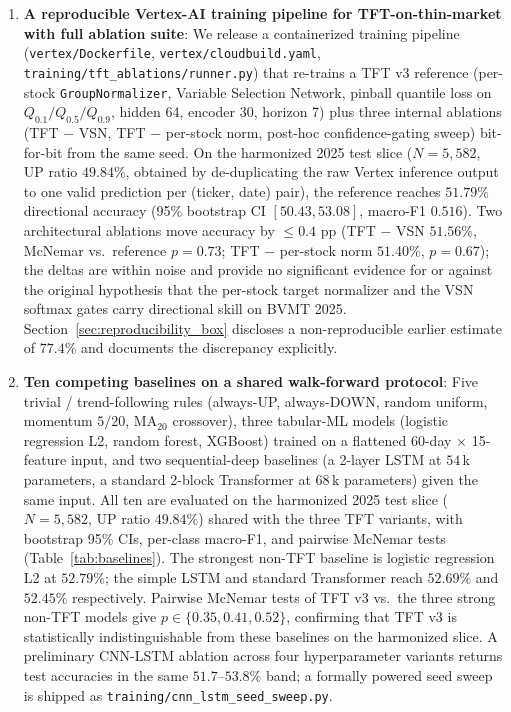 \documentclass[conference]{IEEEtran}
\begin{document}
\begin{enumerate}
\item \textbf{A reproducible Vertex-AI training pipeline for TFT-on-thin-market with full ablation suite}: We release a containerized training pipeline (\texttt{vertex/Dockerfile}, \texttt{vertex/cloudbuild.yaml}, \texttt{training/tft\_ablations/runner.py}) that re-trains a TFT v3 reference (per-stock \texttt{GroupNormalizer}, Variable Selection Network, pinball quantile loss on $Q_{0.1}/Q_{0.5}/Q_{0.9}$, hidden 64, encoder 30, horizon 7) plus three internal ablations (TFT $-$ VSN, TFT $-$ per-stock norm, post-hoc confidence-gating sweep) bit-for-bit from the same seed. On the harmonized 2025 test slice ($N=5{,}582$, UP ratio $49.84\%$, obtained by de-duplicating the raw Vertex inference output to one valid prediction per (ticker, date) pair), the reference reaches $51.79\%$ directional accuracy (95\% bootstrap CI $[50.43, 53.08]$, macro-F1 $0.516$). Two architectural ablations move accuracy by $\leq 0.4$ pp (TFT $-$ VSN $51.56\%$, McNemar vs.\ reference $p = 0.73$; TFT $-$ per-stock norm $51.40\%$, $p = 0.67$); the deltas are within noise and provide no significant evidence for or against the original hypothesis that the per-stock target normalizer and the VSN softmax gates carry directional skill on BVMT 2025. Section~\ref{sec:reproducibility_box} discloses a non-reproducible earlier estimate of $77.4\%$ and documents the discrepancy explicitly.

\item \textbf{Ten competing baselines on a shared walk-forward protocol}: Five trivial / trend-following rules (always-UP, always-DOWN, random uniform, momentum $5/20$, MA$_{20}$ crossover), three tabular-ML models (logistic regression L2, random forest, XGBoost) trained on a flattened 60-day $\times$ 15-feature input, and two sequential-deep baselines (a 2-layer LSTM at $54$\,k parameters, a standard 2-block Transformer at $68$\,k parameters) given the same input. All ten are evaluated on the harmonized 2025 test slice ($N=5{,}582$, UP ratio $49.84\%$) shared with the three TFT variants, with bootstrap 95\% CIs, per-class macro-F1, and pairwise McNemar tests (Table~\ref{tab:baselines}). The strongest non-TFT baseline is logistic regression L2 at $52.79\%$; the simple LSTM and standard Transformer reach $52.69\%$ and $52.45\%$ respectively. Pairwise McNemar tests of TFT v3 vs.\ the three strong non-TFT models give $p \in \{0.35, 0.41, 0.52\}$, confirming that TFT v3 is statistically indistinguishable from these baselines on the harmonized slice. A preliminary CNN-LSTM ablation across four hyperparameter variants returns test accuracies in the same $51.7$--$53.8\%$ band; a formally powered seed sweep is shipped as \texttt{training/cnn\_lstm\_seed\_sweep.py}.


\end{enumerate}
\end{document}
